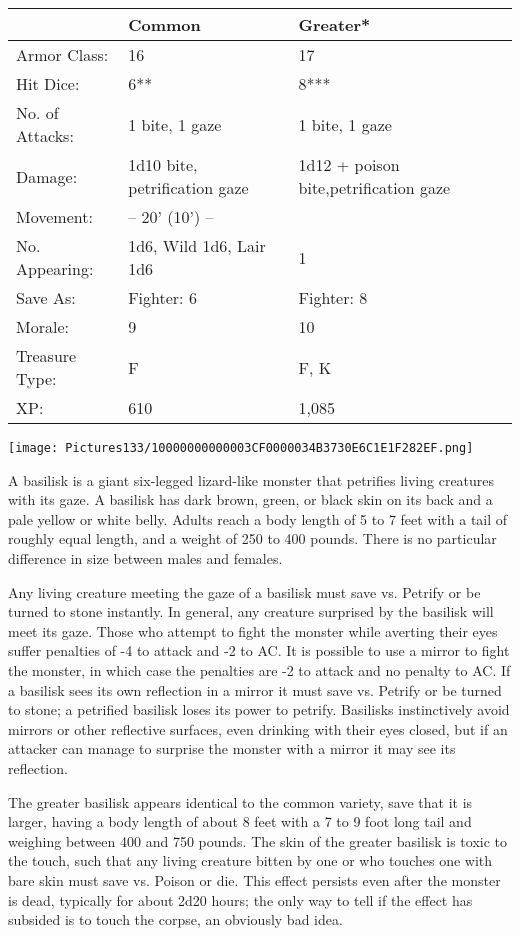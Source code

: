 \documentclass[a4paper,twoside,openany,10pt]{book}
\begin{document}
\begin{multicols}{2}
\begin{tabularx}{0.48\textwidth}{lXX}
& Common & Greater* \\\hline
Armor Class: & 16 & 17 \\\hline
Hit Dice: & 6** & 8*** \\\hline
No. of Attacks: & 1 bite, 1 gaze & 1 bite, 1 gaze \\\hline
Damage: & 1d10 bite, petrification gaze & 1d12 + poison bite,petrification gaze \\\hline
Movement: & -- 20' (10') -- & \\\hline
No. Appearing: & 1d6, Wild 1d6, Lair 1d6 & 1 \\\hline
Save As: & Fighter: 6 & Fighter: 8 \\\hline
Morale: & 9 & 10 \\\hline
Treasure Type: & F & F, K \\\hline
XP: & 610 & 1,085 \\\hline
\end{tabularx}\medskip


\begin{center}
	\texttt{[image: Pictures133/10000000000003CF0000034B3730E6C1E1F282EF.png]}
\end{center}

A basilisk is a giant six-legged lizard-like monster that petrifies living creatures with its gaze. A basilisk has dark brown, green, or black skin on its back and a pale yellow or white belly. Adults reach a body length of 5 to 7 feet with a tail of roughly equal length, and a weight of 250 to 400 pounds. There is no particular difference in size between males and females.

Any living creature meeting the gaze of a basilisk must save vs. Petrify or be turned to stone instantly. In general, any creature surprised by the basilisk will meet its gaze. Those who attempt to fight the monster while averting their eyes suffer penalties of -4 to attack and -2 to AC. It is possible to use a mirror to fight the monster, in which case the penalties are -2 to attack and no penalty to AC. If a basilisk sees its own reflection in a mirror it must save vs. Petrify or be turned to stone; a petrified basilisk loses its power to petrify. Basilisks instinctively avoid mirrors or other reflective surfaces, even drinking with their eyes closed, but if an attacker can manage to surprise the monster with a mirror it may see its reflection.

The greater basilisk appears identical to the common variety, save that it is larger, having a body length of about 8 feet with a 7 to 9 foot long tail and weighing between 400 and 750 pounds. The skin of the greater basilisk is toxic to the touch, such that any living creature bitten by one or who touches one with bare skin must save vs. Poison or die. This effect persists even after the monster is dead, typically for about 2d20 hours; the only way to tell if the effect has subsided is to touch the corpse, an obviously bad idea.


\end{multicols}
\end{document}
